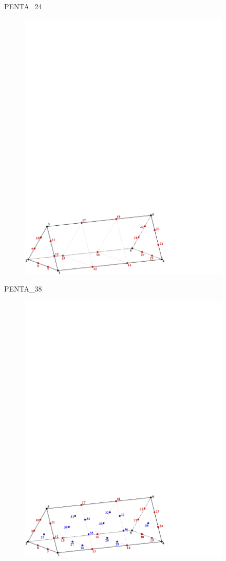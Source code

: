{{{

PENTA\_24
\begin{figure}[!htb]
   \includegraphics[width=4in]{conv.figs/TecplotFiles_Cubic_Element/All_Figures/prism_24}
\end{figure}

\bigskip

\newpage
PENTA\_38
\begin{figure}[!htb]
   \includegraphics[width=4in]{conv.figs/TecplotFiles_Cubic_Element/All_Figures/prism_38}
\end{figure}

}}}
